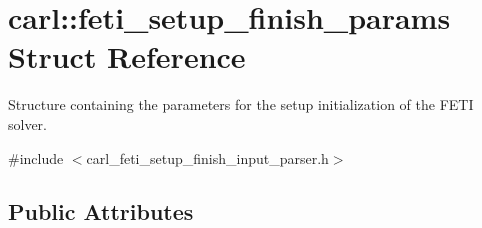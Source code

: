 \hypertarget{structcarl_1_1feti__setup__finish__params}{}\section{carl\+:\+:feti\+\_\+setup\+\_\+finish\+\_\+params Struct Reference}
\label{structcarl_1_1feti__setup__finish__params}


Structure containing the parameters for the setup initialization of the F\+E\+T\+I solver.  




{\ttfamily \#include $<$carl\+\_\+feti\+\_\+setup\+\_\+finish\+\_\+input\+\_\+parser.\+h$>$}

\subsection*{Public Attributes}
